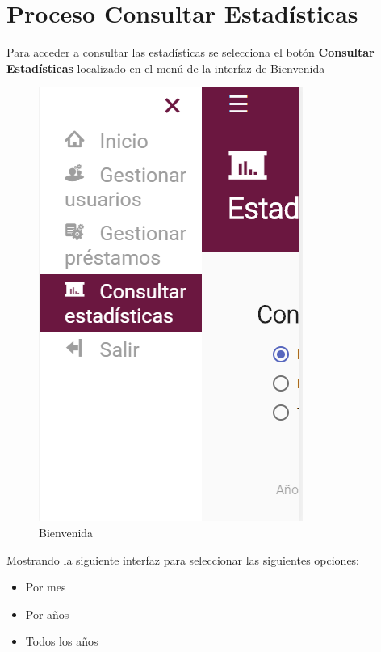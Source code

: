 \chapter{Proceso Consultar Estadísticas }
	Para acceder a consultar las estadísticas se selecciona el botón 
	\textbf{Consultar Estadísticas} localizado en el menú de la interfaz de 
	Bienvenida 
	\begin{figure}[hbtp]

	\includegraphics[scale=0.3]{images/InterfazMovil/IUGS15_binevenida.PNG}
	\caption{Bienvenida}
	\end{figure}
		
	Mostrando la siguiente interfaz para seleccionar las siguientes 
	opciones:
	\begin{itemize}
		\item Por mes
		\item Por años
		\item Todos los años 
	\end{itemize}
	
